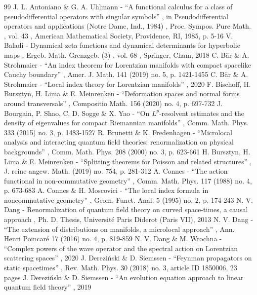 \documentclass[10pt]{amsart}
\theoremstyle{definition}
\begin{document}
\begin{thebibliography}{99}
 J. L. Antoniano \& G. A. Uhlmann - “A functional calculus for a class of pseudodifferential operators with singular symbols” , in Pseudodifferential operators and applications (Notre Dame, Ind., 1984) , Proc. Sympos. Pure Math. , vol. 43 , American Mathematical Society, Providence, RI, 1985, p. 5-16
 V. Baladi - Dynamical zeta functions and dynamical determinants for hyperbolic maps , Ergeb. Math. Grenzgeb. (3) , vol. 68 , Springer, Cham, 2018
 C. Bär \& A. Strohmaier - “An index theorem for Lorentzian manifolds with compact spacelike Cauchy boundary” , Amer. J. Math. 141 (2019) no. 5, p. 1421-1455
 C. Bär \& A. Strohmaier - “Local index theory for Lorentzian manifolds” , 2020
 F. Bischoff, H. Bursztyn, H. Lima \& E. Meinrenken - “Deformation spaces and normal forms around transversals” , Compositio Math. 156 (2020) no. 4, p. 697-732
 J. Bourgain, P. Shao, C. D. Sogge \& X. Yao - “On $L^p$-resolvent estimates and the density of eigenvalues for compact Riemannian manifolds” , Comm. Math. Phys. 333 (2015) no. 3, p. 1483-1527
 R. Brunetti \& K. Fredenhagen - “Microlocal analysis and interacting quantum field theories: renormalization on physical backgrounds” , Comm. Math. Phys. 208 (2000) no. 3, p. 623-661
 H. Bursztyn, H. Lima \& E. Meinrenken - “Splitting theorems for Poisson and related structures” , J. reine angew. Math. (2019) no. 754, p. 281-312
 A. Connes - “The action functional in non-commutative geometry” , Comm. Math. Phys. 117 (1988) no. 4, p. 673-683
 A. Connes \& H. Moscovici - “The local index formula in noncommutative geometry” , Geom. Funct. Anal. 5 (1995) no. 2, p. 174-243
 N. V. Dang - Renormalization of quantum field theory on curved space-times, a causal approach , Ph. D. Thesis, Université Paris Diderot (Paris VII), 2013
 N. V. Dang - “The extension of distributions on manifolds, a microlocal approach” , Ann. Henri Poincaré 17 (2016) no. 4, p. 819-859
 N. V. Dang \& M. Wrochna - “Complex powers of the wave operator and the spectral action on Lorentzian scattering spaces” , 2020
 J. Dereziński \& D. Siemssen - “Feynman propagators on static spacetimes” , Rev. Math. Phys. 30 (2018) no. 3, article ID 1850006, 23 pages
 J. Dereziński \& D. Siemssen - “An evolution equation approach to linear quantum field theory” , 2019

\end{thebibliography}
\end{document}
